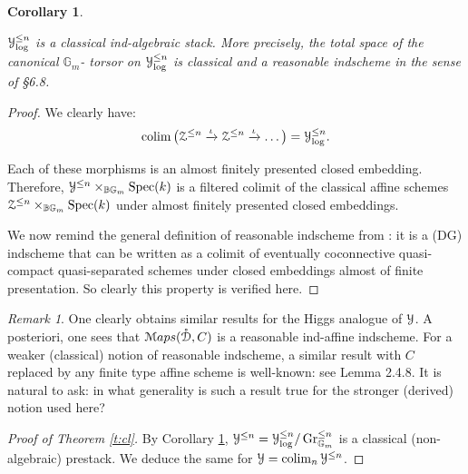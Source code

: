 \documentclass[reqno,11pt]{amsart}
\numberwithin{equation}{subsection}
\newtheorem{cor}[thm]{Corollary}
\theoremstyle{remark}
\newtheorem{rem}[thm]{Remark}
\newcommand{\xar}[1]{\xrightarrow{#1}}
\newcommand{\bB}{{\mathbb B}}
\newcommand{\bG}{{\mathbb G}}
\newcommand{\sD}{{\EuScript D}}
\newcommand{\sM}{{\EuScript M}}
\newcommand{\sY}{{\EuScript Y}}
\newcommand{\sZ}{{\EuScript Z}}
\newcommand{\on}{\operatorname}
\newcommand{\Spec}{\on{Spec}}
\newcommand{\Gr}{\on{Gr}}
\newcommand{\colim}{\on{colim}}
\newcommand{\Maps}{\sM aps}
\renewcommand{\o}[1]{\mathring{#1}}
\begin{document}
\begin{cor}\label{c:yn-log-cl}

$\sY_{\log}^{\leq n}$ is a classical ind-algebraic stack.
More precisely, the total space of the canonical $\bG_m$-
torsor on 
$\sY_{\log}^{\leq n}$ is classical and a reasonable indscheme 
in the sense of \cite{methods} \S 6.8.

\end{cor}

\begin{proof}

We clearly have:
%
\begin{equation}\label{eq:y-log-colim-iota}
\colim \big(\sZ^{\leq n} \xar{\iota} \sZ^{\leq n} \xar{\iota } \ldots \big)
= \sY_{\log}^{\leq n}. 
\end{equation}

\noindent Each of these morphisms is an
almost finitely presented closed
embedding. 
Therefore, $\sY^{\leq n} \times_{\bB \bG_m} \Spec(k)$
is a filtered colimit of the classical affine schemes 
$\sZ^{\leq n} \times_{\bB \bG_m} \Spec(k)$ under 
almost finitely presented closed
embeddings. 

We now remind the general definition of reasonable
indscheme from \cite{methods}: 
it is a (DG) indscheme that can be written
as a colimit of eventually coconnective
quasi-compact quasi-separated schemes
under closed embeddings almost of finite presentation.
So clearly this property is verified here.

\end{proof}

\begin{rem}

One clearly obtains similar results for the Higgs analogue
of $\sY$. A posteriori, one sees that 
$\Maps(\o{\sD},C)$ is a reasonable ind-affine indscheme.
For a weaker (classical) notion of reasonable indscheme, a similar
result with $C$ replaced by any finite type affine scheme
is well-known: see \cite{chiral} Lemma 2.4.8. It is natural to ask: in what
generality is such a result true for the stronger
(derived) notion used here?

\end{rem}

\begin{proof}[Proof of Theorem \ref{t:cl}]

By Corollary \ref{c:yn-log-cl}, 
$\sY^{\leq n} = \sY_{\log}^{\leq n}/\Gr_{\bG_m}^{\leq n}$
is a classical (non-algebraic) prestack. 
We deduce the same for $\sY = \colim_n \sY^{\leq n}$.

\end{proof}
\end{document}
